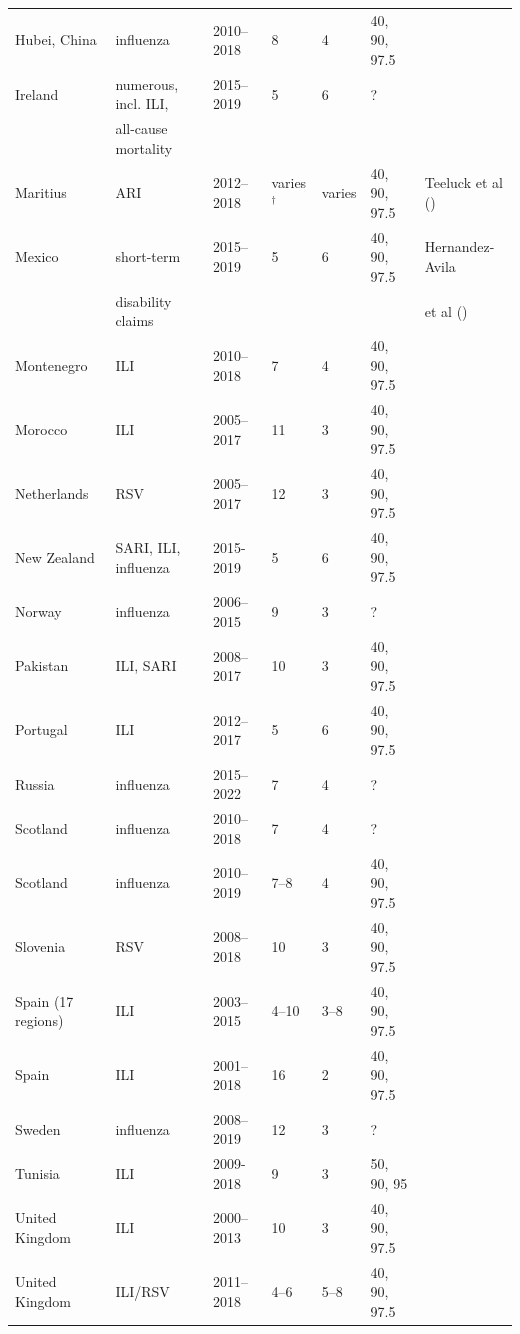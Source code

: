 \documentclass[12pt]{article}
\begin{document}
\begin{table}[h!]
\begin{tabular}{l l l l l l l}
Hubei, China & influenza & 2010--2018 & 8 & 4 & 40, 90, 97.5 & \cite{Jiang2022} \\
Ireland & numerous, incl. ILI, & 2015--2019 & 5 & 6 & ? & \cite{Domegan2022}\\
& all-cause mortality\\
Maritius & ARI & 2012--2018 & varies$^\dagger$ & varies & 40, 90, 97.5 & Teeluck et al (\citeyear{Teeluck2021}) \\
Mexico & short-term& 2015--2019 & 5 & 6 & 40, 90, 97.5 & Hernandez-Avila\\
& disability claims & & & & & et al (\citeyear{HernandezAvila2022})\\
Montenegro & ILI & 2010--2018 & 7 & 4 & 40, 90, 97.5 & \cite{Rakocevic2019}\\
Morocco & ILI & 2005--2017 & 11 & 3 & 40, 90, 97.5 & \cite{Rguig2020}\\
Netherlands & RSV & 2005--2017 & 12 & 3 & 40, 90, 97.5 & \cite{Vos2019}\\
New Zealand & SARI, ILI, influenza & 2015-2019 & 5 & 6 & 40, 90, 97.5 & \cite{Wood2021}\\
Norway & influenza & 2006--2015 & 9 & 3 & ? & \cite{Benedetti2019}\\
Pakistan & ILI, SARI & 2008--2017 & 10 & 3 & 40, 90, 97.5 & \cite{Nisar2020}\\
Portugal & ILI & 2012--2017 & 5 & 6 & 40, 90, 97.5 & \cite{Pascoa2018}\\
Russia & influenza & 2015--2022 & 7 & 4 & ? & \cite{Sominina2022}\\
Scotland & influenza & 2010--2018 & 7 & 4 & ? & \cite{Murray2018}\\
Scotland & influenza & 2010--2019 & 7--8 & 4 & 40, 90, 97.5 & \cite{Dickson2020}\\
Slovenia & RSV & 2008--2018 & 10 & 3 & 40, 90, 97.5 & \cite{Grilc2021}\\
Spain (17 regions) & ILI & 2003--2015 & 4--10 & 3--8 & 40, 90, 97.5 & \cite{Bangert2017}\\
Spain & ILI & 2001--2018 & 16 & 2 & 40, 90, 97.5 & \cite{RedondoBravo2020}\\
Sweden & influenza & 2008--2019 & 12 & 3 & ? & \cite{Spreco2020}\\
Tunisia & ILI & 2009-2018 & 9 & 3 & 50, 90, 95 & \cite{Bouguerra2020}\\
United Kingdom & ILI & 2000--2013 & 10 & 3 & 40, 90, 97.5 & \cite{Green2015}\\
United Kingdom & ILI/RSV & 2011--2018 & 4--6 & 5--8 & 40, 90, 97.5 & \cite{Harcourt2019}\\

\end{tabular}
\end{table}
\end{document}
